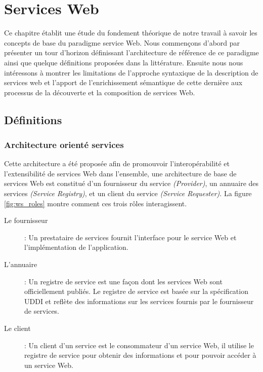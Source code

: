 \chapter{Services Web}
\label{ch:web-service}
Ce chapitre établit une étude du fondement théorique de notre travail
à savoir les concepts de base du paradigme service Web.  Nous
commençons d'abord par présenter un tour d'horizon définissant
l'architecture de référence de ce paradigme ainsi que quelque
définitions proposées dans la littérature. Ensuite nous nous
intéressons à montrer les limitations de l'approche syntaxique de la
description de services web et l'apport de l'enrichissement sémantique
de cette dernière aux processus de la découverte et la composition de
services Web.

\newpage
\section{Définitions}
\label{sec:ws-definitions}
  \subsection{Architecture orienté services}
  \label{sec:soa}
  Cette architecture a été proposée afin de promouvoir
  l'interopérabilité et l'extensibilité de services Web dans
  l'ensemble, une architecture de base de services Web est constitué
  d'un fournisseur du service \textit{(Provider)}, un annuaire des
  services \textit{(Service Registry)}, et un client du service
  \textit{(Service Requester)}. La figure \ref{fig:ws_roles} montre
  comment ces trois rôles interagissent.

  

  \renewcommand{\descriptionlabel}[1]{\hspace{1cm}\textbullet~\textsf{#1}}
  \begin{description}
  \item[Le fournisseur]: Un prestataire de services fournit
    l'interface pour le service Web et l'implémentation de
    l'application.

  \item[L'annuaire]: Un registre de service est une façon dont les
    services Web sont officiellement publiés. Le registre de service
    est basée sur la spécification \textsc{UDDI} et reflète des
    informations sur les services fournis par le fournisseur de
    services.

  \item[Le client]: Un client d'un service est le consommateur d'un
    service Web, il utilise le registre de service pour obtenir des
    informations et pour pouvoir accéder à un service Web.
  \end{description}
  \enddescription

